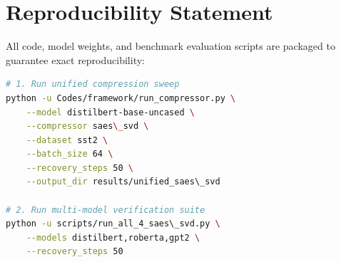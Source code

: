 \section{Reproducibility Statement}
All code, model weights, and benchmark evaluation scripts are packaged to guarantee exact reproducibility:
\begin{lstlisting}[language=bash]
# 1. Run unified compression sweep
python -u Codes/framework/run_compressor.py \
    --model distilbert-base-uncased \
    --compressor saes\_svd \
    --dataset sst2 \
    --batch_size 64 \
    --recovery_steps 50 \
    --output_dir results/unified_saes\_svd

# 2. Run multi-model verification suite
python -u scripts/run_all_4_saes\_svd.py \
    --models distilbert,roberta,gpt2 \
    --recovery_steps 50
\end{lstlisting}
